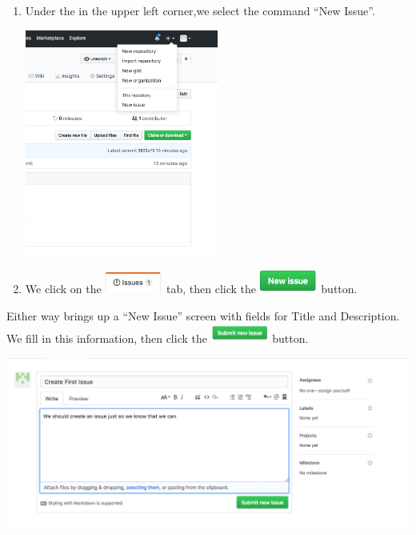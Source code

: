 \documentclass[11pt]{article}
\begin{document}
\begin{enumerate}

\item Under the %
 in the upper left corner,we select the command ``New Issue''. \\

\begin{center}
\includegraphics[width=0.5\textwidth]{NewIssueMenu}
\end{center}

\item We click on the \includegraphics[width=0.75in]{IssuesLink} tab, then click the \includegraphics[width=0.75in]{NewIssueButton} button. 

\end{enumerate} 

Either way brings up a ``New Issue'' screen with fields for Title and Description. We fill in this information, then click the \includegraphics[width=0.75in]{SubmitNewIssue} button. 

\begin{center}
\includegraphics[width=\textwidth]{CreatingAnIssue}
\end{center}
\end{document}
